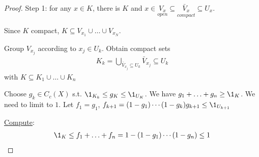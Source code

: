\begin{proof}
	Step 1: for any $x \in K$, there is $K$ and $x \in \underset{open}{V_x} \subseteq \underset{compact}{\bar{V}_x} \subseteq U_x$.

	\noindent Since $K$ compact, $K \subseteq V_{x_{1}} \cup \ldots \cup V_{x_N}$.

	\noindent Group $V_{x_j}$ according to $x_j \in U_{k}$. Obtain compact sets
	\begin{align*}
		K_k = \bigcup_{\bar{V}_{x_j} \subseteq U_k} \bar{V}_{x_j} \subseteq U_k
	\end{align*}
	with $K \subseteq K_1 \cup \ldots \cup K_n$


Choose $g_k \in C_{c} (X)$ s.t. $\1_{K_k} \leq g_K \leq \1_{U_{K}}$. We have $g_1 + \ldots + g_n \geq \1_{K}$. We need to limit to $1$.
Let $f_1 = g_1$, $f_{k+1} = (1-g_1) \cdots (1 - g_{k}) g_{k+1} \leq \1_{U_{k+1}}$

\underline{Compute}:
\begin{align*}
\1_K \leq f_1 + \ldots + f_n = 1 - (1 - g_1) \cdots (1 - g_n) \leq 1
\end{align*}
\end{proof}



